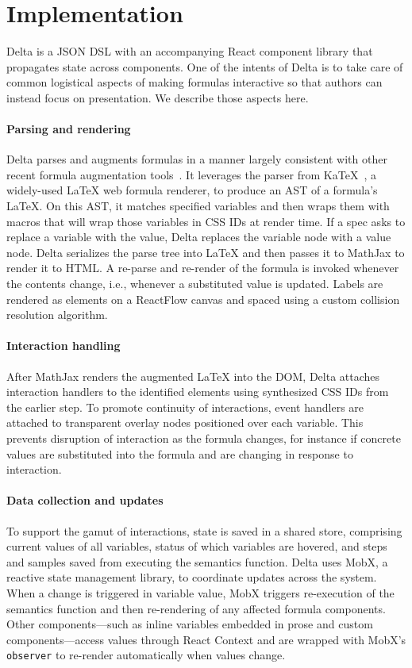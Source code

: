 \section{Implementation}

Delta is a JSON DSL with an accompanying React component library that propagates state across components. One of the intents of Delta is to take care of common logistical aspects of making formulas interactive so that authors can instead focus on presentation. We describe those aspects here. 

\paragraph{Parsing and rendering}
Delta parses and augments formulas in a manner largely consistent with other recent formula augmentation tools~\cite{Wu2023-xc,tao2025freeform}. It leverages the parser from KaTeX~\cite{tool:katex}, a widely-used LaTeX web formula renderer, to produce an AST of a formula's LaTeX. On this AST, it matches specified variables and then wraps them with macros that will wrap those variables in CSS IDs at render time. If a spec asks to replace a variable with the value, Delta replaces the variable node with a value node. Delta serializes the parse tree into LaTeX and then passes it to MathJax to render it to HTML. A re-parse and re-render of the formula is invoked whenever the contents change, i.e., whenever a substituted value is updated. Labels are rendered as elements on a ReactFlow canvas and spaced using a custom collision resolution algorithm.

\paragraph{Interaction handling}
After MathJax renders the augmented LaTeX into the DOM, Delta attaches interaction handlers to the identified elements using synthesized CSS IDs from the earlier step. To promote continuity of interactions, event handlers are attached to transparent overlay nodes positioned over each variable. This prevents disruption of interaction as the formula changes, for instance if concrete values are substituted into the formula and are changing in response to interaction.

\paragraph{Data collection and updates}
To support the gamut of interactions, state is saved in a shared store, comprising current values of all variables, status of which variables are hovered, and steps and samples saved from executing the semantics function. Delta uses MobX, a reactive state management library, to coordinate updates across the system. When a change is triggered in variable value, MobX triggers re-execution of the semantics function and then re-rendering of any affected formula components. Other components---such as inline variables embedded in prose and custom components---access values through React Context and are wrapped with MobX's \texttt{observer} to re-render automatically when values change.